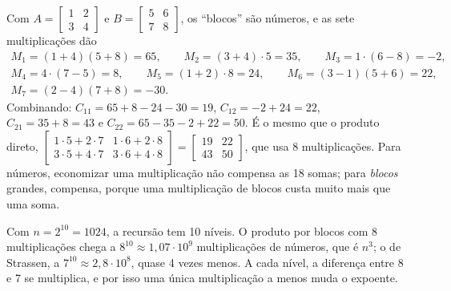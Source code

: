 \begin{exemplo}
Com $A=\begin{bmatrix}1&2\\3&4\end{bmatrix}$ e $B=\begin{bmatrix}5&6\\7&8\end{bmatrix}$, os ``blocos'' são números, e as sete multiplicações dão
\begin{gather*}
M_1=(1+4)(5+8)=65,\qquad M_2=(3+4)\cdot5=35,\qquad M_3=1\cdot(6-8)=-2,\\
M_4=4\cdot(7-5)=8,\qquad M_5=(1+2)\cdot8=24,\qquad M_6=(3-1)(5+6)=22,\\
M_7=(2-4)(7+8)=-30.
\end{gather*}
Combinando: $C_{11}=65+8-24-30=19$, $C_{12}=-2+24=22$, $C_{21}=35+8=43$ e $C_{22}=65-35-2+22=50$. É o mesmo que o produto direto, $\begin{bmatrix}1\cdot5+2\cdot7&1\cdot6+2\cdot8\\3\cdot5+4\cdot7&3\cdot6+4\cdot8\end{bmatrix}=\begin{bmatrix}19&22\\43&50\end{bmatrix}$, que usa 8 multiplicações. Para números, economizar uma multiplicação não compensa as 18 somas; para \emph{blocos} grandes, compensa, porque uma multiplicação de blocos custa muito mais que uma soma.
\end{exemplo}

\begin{exemplo}
Com $n=2^{10}=1024$, a recursão tem 10 níveis. O produto por blocos com 8 multiplicações chega a $8^{10}\approx1{,}07\cdot10^9$ multiplicações de números, que é $n^3$; o de Strassen, a $7^{10}\approx2{,}8\cdot10^8$, quase 4 vezes menos. A cada nível, a diferença entre 8 e 7 se multiplica, e por isso uma única multiplicação a menos muda o expoente.
\end{exemplo}

